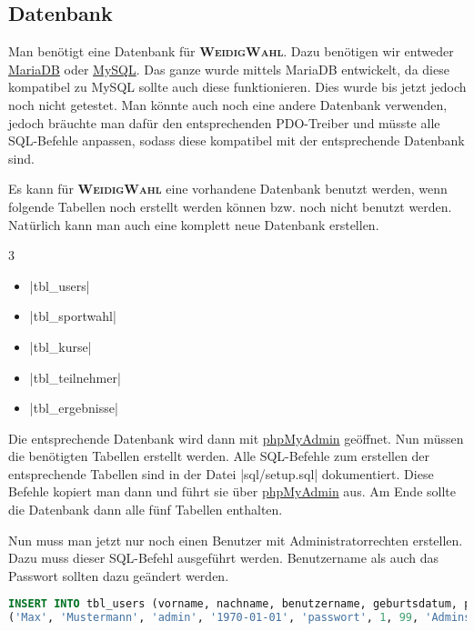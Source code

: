 \documentclass[ngerman]{ltxdoc}
\newcommand{\name}{\textbf{\textsc{WeidigWahl}}\xspace}
\begin{document}
\subsection{Datenbank}

Man benötigt eine Datenbank für \name. Dazu benötigen wir entweder \href{https://mariadb.org/}{MariaDB}
oder \href{https://www.mysql.com/}{MySQL}. Das ganze wurde mittels MariaDB entwickelt,
da diese kompatibel zu MySQL sollte auch diese funktionieren. Dies wurde bis jetzt
jedoch noch nicht getestet. Man könnte auch noch eine andere Datenbank verwenden,
jedoch bräuchte man dafür den entsprechenden PDO-Treiber und müsste alle SQL-Befehle
anpassen, sodass diese kompatibel mit der entsprechende Datenbank sind.

Es kann für \name eine vorhandene Datenbank benutzt werden, wenn folgende Tabellen
noch erstellt werden können bzw. noch nicht benutzt werden. Natürlich kann man
auch eine komplett neue Datenbank erstellen.

\begin{multicols}{3}
  \begin{itemize}
    \item |tbl_users|
    \item |tbl_sportwahl|
    \item |tbl_kurse|
    \item |tbl_teilnehmer|
    \item |tbl_ergebnisse|
  \end{itemize}
\end{multicols}

Die entsprechende Datenbank wird dann mit \href{https://www.phpmyadmin.net/}{phpMyAdmin} geöffnet. Nun müssen die benötigten
Tabellen erstellt werden. Alle SQL-Befehle zum erstellen der entsprechende Tabellen sind
in der Datei |sql/setup.sql| dokumentiert. Diese Befehle kopiert man dann und führt sie
über \href{https://www.phpmyadmin.net/}{phpMyAdmin} aus. Am Ende sollte die Datenbank
dann alle fünf Tabellen enthalten.

Nun muss man jetzt nur noch einen Benutzer mit Administratorrechten erstellen. Dazu muss
dieser SQL-Befehl ausgeführt werden. Benutzername als auch das Passwort sollten
dazu geändert werden.

\begin{lstlisting}[language=SQL, breaklines=true]
INSERT INTO tbl_users (vorname, nachname, benutzername, geburtsdatum, passwort, ist_aktiv, jahrgang, klasse, datum_erstellt, datum_letzte_anderung, kann_reset_anfordern, ist_admin) VALUES
('Max', 'Mustermann', 'admin', '1970-01-01', 'passwort', 1, 99, 'Admins', NOW(), NOW(), 1, 1);
\end{lstlisting}
\end{document}
